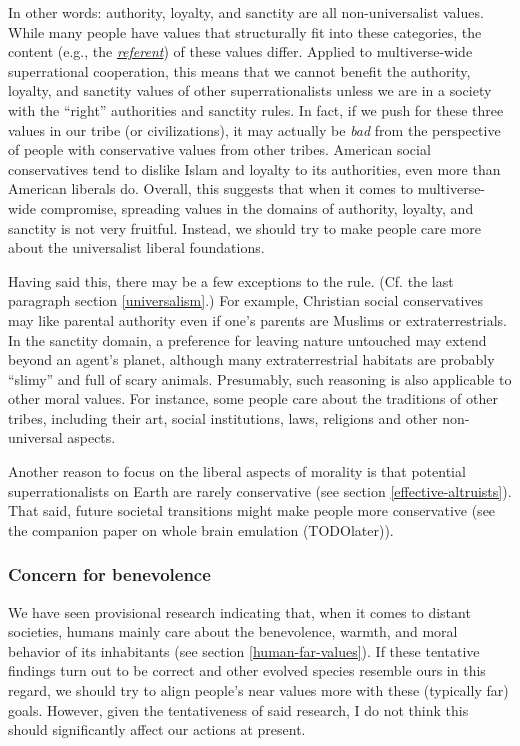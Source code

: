 In other words: authority, loyalty, and sanctity are all
non-universalist values. While many people have values that structurally
fit into these categories, the content (e.g., the
\href{https://en.wikipedia.org/wiki/Referent}{\emph{referent}}) of these
values differ. Applied to multiverse-wide superrational cooperation,
this means that we cannot benefit the authority, loyalty, and sanctity
values of other superrationalists unless we are in a society with the
``right'' authorities and sanctity rules. In fact, if we push for these
three values in our tribe (or civilizations), it may actually be
\emph{bad} from the perspective of people with conservative values from
other tribes. American social conservatives tend to dislike Islam and
loyalty to its authorities, even more than American liberals do.
Overall, this suggests that when it comes to multiverse-wide compromise,
spreading values in the domains of authority, loyalty, and sanctity is
not very fruitful. Instead, we should try to make people care more about
the universalist liberal foundations.

Having said this, there may be a few exceptions to the rule. (Cf. the
last paragraph section
\ref{universalism}.) For example,
Christian social conservatives may like parental authority even if one's
parents are Muslims or extraterrestrials. In the sanctity domain, a
preference for leaving nature untouched may extend beyond an agent's
planet, although many extraterrestrial habitats are probably ``slimy''
and full of scary animals. Presumably, such reasoning is also applicable
to other moral values. For instance, some people care about the
traditions of other tribes, including their art, social institutions,
laws, religions and other non-universal aspects.

Another reason to focus on the liberal aspects of morality is that
potential superrationalists on Earth are rarely conservative (see
section \ref{effective-altruists}). That said, future societal transitions might make people
more conservative (see the companion paper on whole brain emulation
(TODOlater)).

\subsubsection{Concern for benevolence}\label{concern-for-benevolence}

We have seen provisional research indicating that, when it comes to
distant societies, humans mainly care about the benevolence, warmth, and
moral behavior of its inhabitants (see section
\ref{human-far-values}). If
these tentative findings turn out to be correct and other evolved
species resemble ours in this regard, we should try to align people's
near values more with these (typically far) goals. However, given the
tentativeness of said research, I do not think this should significantly
affect our actions at present.

